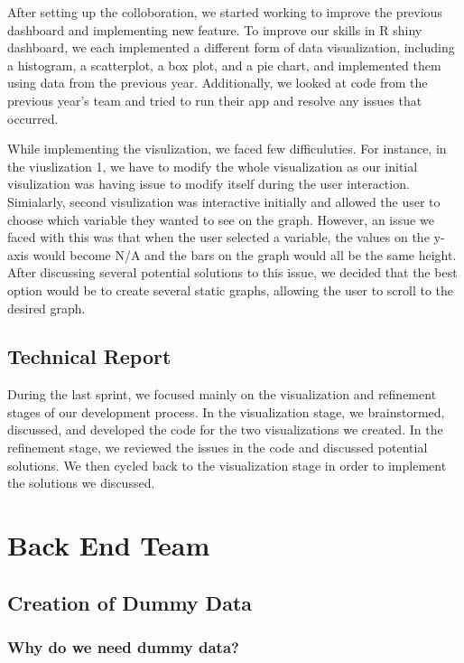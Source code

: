 \documentclass[]{book}
\begin{document}
After setting up the colloboration, we started working to improve the
previous dashboard and implementing new feature. To improve our skills
in R shiny dashboard, we each implemented a different form of data
visualization, including a histogram, a scatterplot, a box plot, and a
pie chart, and implemented them using data from the previous year.
Additionally, we looked at code from the previous year's team and tried
to run their app and resolve any issues that occurred.

While implementing the visulization, we faced few difficuluties. For
instance, in the viuslization 1, we have to modify the whole
visualization as our initial visulization was having issue to modify
itself during the user interaction. Simialarly, second visulization was
interactive initially and allowed the user to choose which variable they
wanted to see on the graph. However, an issue we faced with this was
that when the user selected a variable, the values on the y-axis would
become N/A and the bars on the graph would all be the same height. After
discussing several potential solutions to this issue, we decided that
the best option would be to create several static graphs, allowing the
user to scroll to the desired graph.

\section{Technical Report}\label{technical-report-1}

During the last sprint, we focused mainly on the visualization and
refinement stages of our development process. In the visualization
stage, we brainstormed, discussed, and developed the code for the two
visualizations we created. In the refinement stage, we reviewed the
issues in the code and discussed potential solutions. We then cycled
back to the visualization stage in order to implement the solutions we
discussed.

\chapter{Back End Team}\label{back-end-team}

\section{Creation of Dummy Data}\label{creation-of-dummy-data}

\subsection{Why do we need dummy data?}\label{why-do-we-need-dummy-data}
\end{document}
